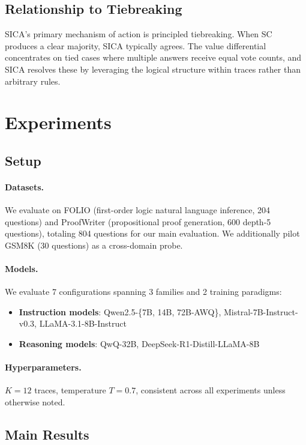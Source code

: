 \documentclass[11pt,a4paper]{article}
\begin{document}
\subsection{Relationship to Tiebreaking}

SICA's primary mechanism of action is principled tiebreaking. When SC produces a clear majority, SICA typically agrees. The value differential concentrates on tied cases where multiple answers receive equal vote counts, and SICA resolves these by leveraging the logical structure within traces rather than arbitrary rules.

\section{Experiments}

\subsection{Setup}

\paragraph{Datasets.} We evaluate on FOLIO (first-order logic natural language inference, 204 questions) and ProofWriter (propositional proof generation, 600 depth-5 questions), totaling 804 questions for our main evaluation. We additionally pilot GSM8K (30 questions) as a cross-domain probe.

\paragraph{Models.} We evaluate 7 configurations spanning 3 families and 2 training paradigms:
\begin{itemize}
\item \textbf{Instruction models}: Qwen2.5-\{7B, 14B, 72B-AWQ\}, Mistral-7B-Instruct-v0.3, LLaMA-3.1-8B-Instruct
\item \textbf{Reasoning models}: QwQ-32B, DeepSeek-R1-Distill-LLaMA-8B
\end{itemize}

\paragraph{Hyperparameters.} $K=12$ traces, temperature $T=0.7$, consistent across all experiments unless otherwise noted.

\subsection{Main Results}
\end{document}
